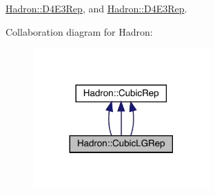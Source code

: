 \mbox{\hyperlink{structHadron_1_1D4E3Rep}{Hadron\+::\+D4\+E3\+Rep}}, and \mbox{\hyperlink{structHadron_1_1D4E3Rep}{Hadron\+::\+D4\+E3\+Rep}}.



Collaboration diagram for Hadron\+:
\nopagebreak
\begin{figure}[H]
\begin{center}
\leavevmode
\includegraphics[width=192pt]{dd/dcc/structHadron_1_1CubicLGRep__coll__graph}
\end{center}
\end{figure}
